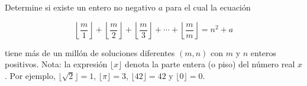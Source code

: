 Determine si existe un entero no negativo $a$ para el cual la ecuación

\[\left\lfloor\frac{m}{1}\right\rfloor + \left\lfloor\frac{m}{2}\right\rfloor + \left\lfloor\frac{m}{3}\right\rfloor + \cdots + \left\lfloor\frac{m}{m}\right\rfloor = n^2 + a\]

tiene más de un millón de soluciones diferentes $(m, n)$ con $m$ y $n$ enteros positivos.
Nota: la expresión $\lfloor x\rfloor$ denota la parte entera (o piso) del número real $x$. Por ejemplo, $\lfloor \sqrt{2} \rfloor = 1$,
$\lfloor \pi \rfloor = 3$, $\lfloor 42 \rfloor = 42$ y $\lfloor 0 \rfloor = 0$.